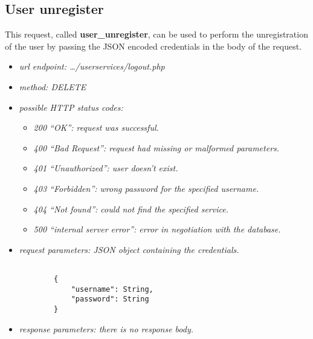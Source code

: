 \documentclass[a4paper,12pt]{article}
\begin{document}
        \clearpage
        \subsection[User unregister]{User unregister}

            \vspace{10pt}

            This request, called \textbf{user\_unregister}, can be used to perform the unregistration of the user by passing the JSON encoded credentials in the body of the request.

            \begin{itemize}

                \item \textit{url endpoint: \ldots/userservices/logout.php}
                \item \textit{method: DELETE}
                \item \textit{possible HTTP status codes:}

                    \begin{itemize}

                        \item \textit{200 ``OK'': request was successful.}
                        \item \textit{400 ``Bad Request'': request had missing or malformed parameters.}
                        \item \textit{401 ``Unauthorized'': user doesn't exist.}
                        \item \textit{403 ``Forbidden'': wrong password for the specified username.}
                        \item \textit{404 ``Not found'': could not find the specified service.}
                        \item \textit{500 ``internal server error'': error in negotiation with the database.}

                    \end{itemize}

                \item \textit{request parameters: JSON object containing the credentials.}
    
    \begin{verbatim}
                        
        {
            "username": String,
            "password": String
        }

    \end{verbatim}

                \item \textit{response parameters: there is no response body.}

            \end{itemize}
\end{document}
